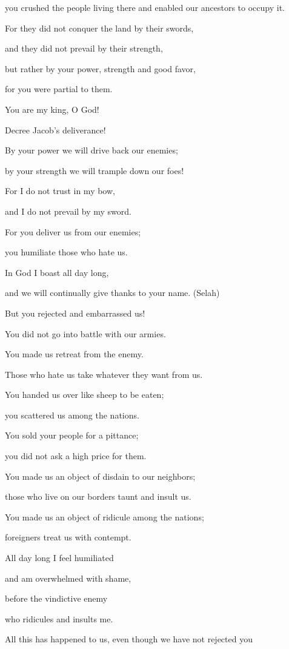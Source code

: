{\par }{\Q you crushed the people
living there
and enabled our ancestors to occupy it.
\par }{\Q {}For
they did not
conquer
the land
by their swords,
\par }{\Q and they did not
prevail
by their strength,
\par }{\Q but rather
by your power,
strength
and good favor,
\par }{\Q for
you were partial to them.
\par }{\Q {}You
are my king,
O God!
\par }{\Q Decree
Jacob’s
deliverance!
\par }{\Q {}By your power we will drive back
our enemies;
\par }{\Q by your strength
we will trample down
our foes!
\par }{\Q {}For
I do not
trust
in my bow,
\par }{\Q and I do not
prevail
by my sword.
\par }{\Q {}For
you deliver
us from our enemies;
\par }{\Q you humiliate
those who hate us.
\par }{\Q {}In God
I boast
all
day
long,
\par }{\Q and we will continually
give thanks
to your name.
(Selah)
\par }{\Q {}But you rejected
and embarrassed
us!
\par }{\Q You did not
go
into battle
with our armies.
\par }{\Q {}You made us retreat
from
the enemy.
\par }{\Q Those who hate
us take whatever they want from us.
\par }{\Q {}You handed
us over like sheep
to be eaten;
\par }{\Q you scattered
us among the nations.
\par }{\Q {}You sold
your people
for a pittance;
\par }{\Q you did not
ask a high price for them.
\par }{\Q {}You made
us an object of disdain
to our neighbors;
\par }{\Q those who live on our borders
taunt
and insult us.
\par }{\Q {}You made
us an object of ridicule
among the nations;
\par }{\Q foreigners
treat us with contempt.
\par }{\Q {}All
day
long I feel humiliated
\par }{\Q and am overwhelmed
with shame,
\par }{\Q {}before
the vindictive
enemy
\par }{\Q who ridicules
and insults me.
\par }{\Q {}All
this
has happened
to us, even though we have not
rejected
you

}

